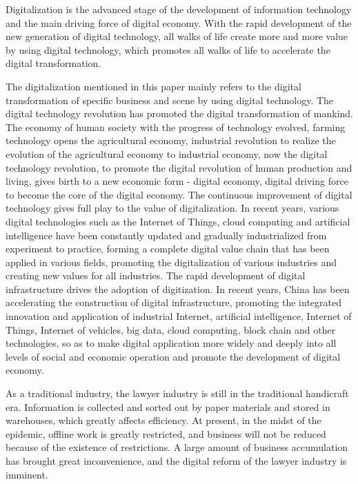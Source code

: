 
\begin{digest}
  Digitalization is the advanced stage of the development of information technology and the main driving force of digital economy. With the rapid development of the new generation of digital technology, all walks of life create more and more value by using digital technology, which promotes all walks of life to accelerate the digital transformation.



The digitalization mentioned in this paper mainly refers to the digital transformation of specific business and scene by using digital technology. The digital technology revolution has promoted the digital transformation of mankind. The economy of human society with the progress of technology evolved, farming technology opens the agricultural economy, industrial revolution to realize the evolution of the agricultural economy to industrial economy, now the digital technology revolution, to promote the digital revolution of human production and living, gives birth to a new economic form - digital economy, digital driving force to become the core of the digital economy. The continuous improvement of digital technology gives full play to the value of digitalization. In recent years, various digital technologies such as the Internet of Things, cloud computing and artificial intelligence have been constantly updated and gradually industrialized from experiment to practice, forming a complete digital value chain that has been applied in various fields, promoting the digitalization of various industries and creating new values for all industries. The rapid development of digital infrastructure drives the adoption of digitization. In recent years, China has been accelerating the construction of digital infrastructure, promoting the integrated innovation and application of industrial Internet, artificial intelligence, Internet of Things, Internet of vehicles, big data, cloud computing, block chain and other technologies, so as to make digital application more widely and deeply into all levels of social and economic operation and promote the development of digital economy.



As a traditional industry, the lawyer industry is still in the traditional handicraft era. Information is collected and sorted out by paper materials and stored in warehouses, which greatly affects efficiency. At present, in the midst of the epidemic, offline work is greatly restricted, and business will not be reduced because of the existence of restrictions. A large amount of business accumulation has brought great inconvenience, and the digital reform of the lawyer industry is imminent.




\end{digest}
